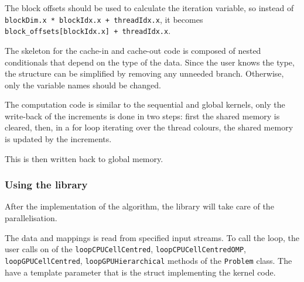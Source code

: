 The block offsets should be used to calculate the iteration variable, so instead
of \lstinline!blockDim.x * blockIdx.x + threadIdx.x!, it becomes
\lstinline!block_offsets[blockIdx.x] + threadIdx.x!.

The skeleton for the cache-in and cache-out code is composed of nested
conditionals that depend on the type of the data. Since the user knows the type,
the structure can be simplified by removing any unneeded branch. Otherwise, only
the variable names should be changed.

The computation code is similar to the sequential and global kernels, only the
write-back of the increments is done in two steps: first the shared memory is
cleared, then, in a for loop iterating over the thread colours, the shared
memory is updated by the increments.

This is then written back to global memory.

\subsubsection{Using the library}

After the implementation of the algorithm, the library will take care of the
parallelisation.

The data and mappings is read from specified input streams. To call the loop,
the user calls on of the \lstinline!loopCPUCellCentred!,
\lstinline!loopCPUCellCentredOMP!, \lstinline!loopGPUCellCentred!,
\lstinline!loopGPUHierarchical! methods of the \lstinline!Problem! class. The
have a template parameter that is the struct implementing the kernel code.
